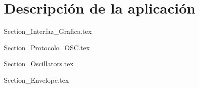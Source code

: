 \chapter{Descripción de la aplicación}

	{Section_Interfaz_Grafica.tex}
	
	{Section_Protocolo_OSC.tex}
	
	{Section_Oscillators.tex}
	
	{Section_Envelope.tex}
